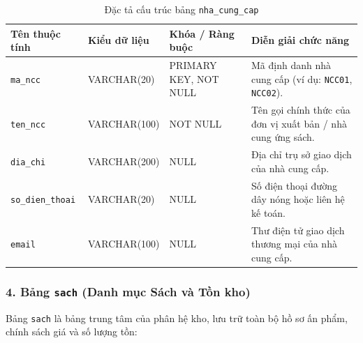 \documentclass[12pt,a4paper]{article}
\begin{document}
\begin{table}[H]
\centering
\small
\renewcommand{\arraystretch}{1.2}
\begin{tabularx}{\textwidth}{|>{\raggedright\arraybackslash}p{3.0cm}|>{\raggedright\arraybackslash}p{2.6cm}|>{\raggedright\arraybackslash}p{3.8cm}|>{\raggedright\arraybackslash}X|}
\hline
\textbf{Tên thuộc tính} & \textbf{Kiểu dữ liệu} & \textbf{Khóa / Ràng buộc} & \textbf{Diễn giải chức năng} \\
\hline
\texttt{ma\_ncc} & VARCHAR(20) & PRIMARY KEY, NOT NULL & Mã định danh nhà cung cấp (ví dụ: \texttt{NCC01}, \texttt{NCC02}). \\
\hline
\texttt{ten\_ncc} & VARCHAR(100) & NOT NULL & Tên gọi chính thức của đơn vị xuất bản / nhà cung ứng sách. \\
\hline
\texttt{dia\_chi} & VARCHAR(200) & NULL & Địa chỉ trụ sở giao dịch của nhà cung cấp. \\
\hline
\texttt{so\_dien\_thoai} & VARCHAR(20) & NULL & Số điện thoại đường dây nóng hoặc liên hệ kế toán. \\
\hline
\texttt{email} & VARCHAR(100) & NULL & Thư điện tử giao dịch thương mại của nhà cung cấp. \\
\hline
\end{tabularx}
\caption{Đặc tả cấu trúc bảng \texttt{nha\_cung\_cap}}
\label{tab:csdl-nhacungcap}
\end{table}

\newpage
\subsubsection*{4. Bảng \texttt{sach} (Danh mục Sách và Tồn kho)}
Bảng \texttt{sach} là bảng trung tâm của phân hệ kho, lưu trữ toàn bộ hồ sơ ấn phẩm, chính sách giá và số lượng tồn:
\end{document}
